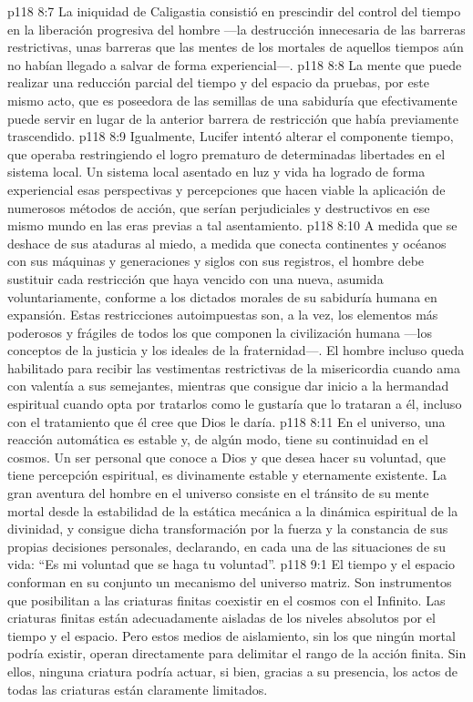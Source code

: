 \vs p118 8:7 La iniquidad de Caligastia consistió en prescindir del control del tiempo en la liberación progresiva del hombre ---la destrucción innecesaria de las barreras restrictivas, unas barreras que las mentes de los mortales de aquellos tiempos aún no habían llegado a salvar de forma experiencial---.
\vs p118 8:8 La mente que puede realizar una reducción parcial del tiempo y del espacio da pruebas, por este mismo acto, que es poseedora de las semillas de una sabiduría que efectivamente puede servir en lugar de la anterior barrera de restricción que había previamente trascendido.
\vs p118 8:9 Igualmente, Lucifer intentó alterar el componente tiempo, que operaba restringiendo el logro prematuro de determinadas libertades en el sistema local. Un sistema local asentado en luz y vida ha logrado de forma experiencial esas perspectivas y percepciones que hacen viable la aplicación de numerosos métodos de acción, que serían perjudiciales y destructivos en ese mismo mundo en las eras previas a tal asentamiento.
\vs p118 8:10 A medida que se deshace de sus ataduras al miedo, a medida que conecta continentes y océanos con sus máquinas y generaciones y siglos con sus registros, el hombre debe sustituir cada restricción que haya vencido con una nueva, asumida voluntariamente, conforme a los dictados morales de su sabiduría humana en expansión. Estas restricciones autoimpuestas son, a la vez, los elementos más poderosos y frágiles de todos los que componen la civilización humana ---los conceptos de la justicia y los ideales de la fraternidad---. El hombre incluso queda habilitado para recibir las vestimentas restrictivas de la misericordia cuando ama con valentía a sus semejantes, mientras que consigue dar inicio a la hermandad espiritual cuando opta por tratarlos como le gustaría que lo trataran a él, incluso con el tratamiento que él cree que Dios le daría.
\vs p118 8:11 En el universo, una reacción automática es estable y, de algún modo, tiene su continuidad en el cosmos. Un ser personal que conoce a Dios y que desea hacer su voluntad, que tiene percepción espiritual, es divinamente estable y eternamente existente. La gran aventura del hombre en el universo consiste en el tránsito de su mente mortal desde la estabilidad de la estática mecánica a la dinámica espiritual de la divinidad, y consigue dicha transformación por la fuerza y la constancia de sus propias decisiones personales, declarando, en cada una de las situaciones de su vida: “Es mi voluntad que se haga tu voluntad”.
\vs p118 9:1 El tiempo y el espacio conforman en su conjunto un mecanismo del universo matriz. Son instrumentos que posibilitan a las criaturas finitas coexistir en el cosmos con el Infinito. Las criaturas finitas están adecuadamente aisladas de los niveles absolutos por el tiempo y el espacio. Pero estos medios de aislamiento, sin los que ningún mortal podría existir, operan directamente para delimitar el rango de la acción finita. Sin ellos, ninguna criatura podría actuar, si bien, gracias a su presencia, los actos de todas las criaturas están claramente limitados.
